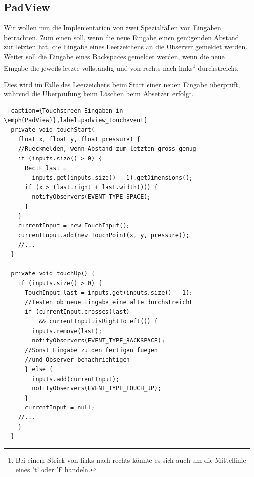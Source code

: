 \subsection{PadView}

Wir wollen nun die Implementation von zwei Spezialfällen von Eingaben betrachten. Zum einen soll, wenn die neue Eingabe einen genügenden Abstand zur letzten hat, die Eingabe eines Leerzeichens an die Observer gemeldet werden. Weiter soll die Eingabe eines Backspaces gemeldet werden, wenn die neue Eingabe die jeweils letzte vollständig und von rechts nach links\footnote{Bei einem Strich von links nach rechts könnte es sich auch um die Mittellinie eines 't' oder 'f' handeln.} durchstreicht.

Dies wird im Falle des Leerzeichens beim Start einer neuen Eingabe überprüft, während die Überprüfung beim Löschen beim Absetzen erfolgt.

\begin{lstlisting} [caption={Touchscreen-Eingaben in \emph{PadView}},label=padview_touchevent]
  private void touchStart(
    float x, float y, float pressure) {
    //Rueckmelden, wenn Abstand zum letzten gross genug
    if (inputs.size() > 0) {
      RectF last = 
        inputs.get(inputs.size() - 1).getDimensions();
      if (x > (last.right + last.width())) {
        notifyObservers(EVENT_TYPE_SPACE);
      }
    }
    currentInput = new TouchInput();
    currentInput.add(new TouchPoint(x, y, pressure));
    //...
  }

  private void touchUp() {
    if (inputs.size() > 0) {
      TouchInput last = inputs.get(inputs.size() - 1);
      //Testen ob neue Eingabe eine alte durchstreicht
      if (currentInput.crosses(last) 
          && currentInput.isRightToLeft()) {
        inputs.remove(last);
        notifyObservers(EVENT_TYPE_BACKSPACE);
      //Sonst Eingabe zu den fertigen fuegen 
      //und Observer benachrichtigen
      } else {
        inputs.add(currentInput);
        notifyObservers(EVENT_TYPE_TOUCH_UP);
      }
      currentInput = null;
    //...
    }
  }
\end{lstlisting}


